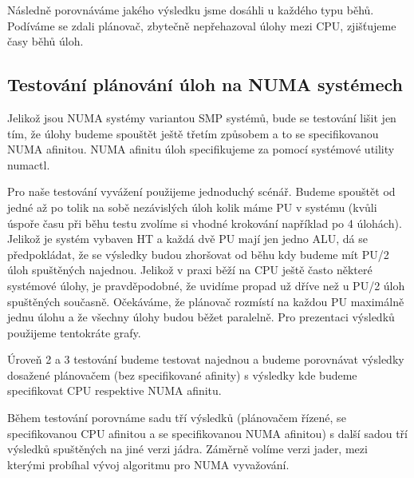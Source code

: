 \documentclass[a4paper,12pt]{article}
\begin{document}
Následně porovnáváme jakého výsledku jsme dosáhli u každého typu běhů. Podíváme se zdali plánovač, zbytečně nepřehazoval úlohy mezi CPU, zjišťujeme časy běhů úloh.

\subsection{Testování plánování úloh na NUMA systémech}

Jelikož jsou NUMA systémy variantou SMP systémů, bude se testování lišit jen tím, že úlohy budeme spouštět ještě třetím způsobem a to se specifikovanou NUMA afinitou. NUMA afinitu úloh specifikujeme za pomocí systémové utility numactl.

Pro naše testování vyvážení použijeme jednoduchý scénář. Budeme spouštět od jedné až po tolik na sobě nezávislých úloh kolik máme PU v systému (kvůli úspoře času při běhu testu zvolíme si vhodné krokování například po 4 úlohách). Jelikož je systém vybaven HT a každá dvě PU mají jen jedno ALU, dá se předpokládat, že se výsledky budou zhoršovat od běhu kdy budeme mít PU/2 úloh spuštěných najednou. Jelikož v praxi běží na CPU ještě často některé systémové úlohy, je pravděpodobné, že uvidíme propad už dříve než u PU/2 úloh spuštěných současně. Očekáváme, že plánovač rozmístí na každou PU maximálně jednu úlohu a že všechny úlohy budou běžet paralelně. Pro prezentaci výsledků použijeme tentokráte grafy.

Úroveň 2 a 3 testování budeme testovat najednou a budeme porovnávat výsledky dosažené plánovačem (bez specifikované afinity) s výsledky kde budeme specifikovat CPU respektive NUMA afinitu.

Během testování porovnáme sadu tří výsledků (plánovačem řízené, se specifikovanou CPU afinitou a se specifikovanou NUMA afinitou) s další sadou tří výsledků spuštěných na jiné verzi jádra. Záměrně volíme verzi jader, mezi kterými probíhal vývoj algoritmu pro NUMA vyvažování.
\end{document}
